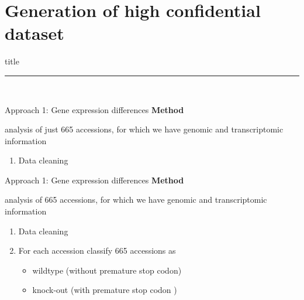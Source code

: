 \documentclass{beamer}
\begin{document}
\section{Generation of high confidential dataset}
\begin{frame}[plain]
    \vfill
    \centering
    \begin{beamercolorbox}[sep=8pt,center,shadow=true,rounded=true]{title}
      \insertsectionhead\par%
      \noindent\rule{10cm}{1pt} \\
    \end{beamercolorbox}
    \vfill
\end{frame}
\begin{frame}{Approach 1: Gene expression differences}
	\textbf{Method}

	analysis of just 665 accessions, for which we have genomic and transcriptomic information
	
	\vspace{5mm}
	\begin{enumerate}
		\item[1.)] Data cleaning
	\end{enumerate}
\end{frame}
\begin{frame}{Approach 1: Gene expression differences}
	\textbf{Method}

	analysis of 665 accessions, for which we have genomic and transcriptomic information
	
	\vspace{5mm}
	\begin{enumerate}
		\item[1.)] Data cleaning
		\item[2.)] For each accession classify 665 accessions as
		\begin{itemize}
			\item wildtype (without premature stop codon)
			\item knock-out (with premature stop codon )
		\end{itemize} 
	\end{enumerate}
\end{frame}
\end{document}
